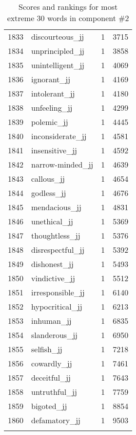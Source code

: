\begin{longtable}[!htbp]{| rlr@{.}l |}
    1833 & discourteous\_jj & 1 & 3715 \\
    1834 & unprincipled\_jj & 1 & 3858 \\
    1835 & unintelligent\_jj & 1 & 4069 \\
    1836 & ignorant\_jj & 1 & 4169 \\
    1837 & intolerant\_jj & 1 & 4180 \\
    1838 & unfeeling\_jj & 1 & 4299 \\
    1839 & polemic\_jj & 1 & 4445 \\
    1840 & inconsiderate\_jj & 1 & 4581 \\
    1841 & insensitive\_jj & 1 & 4592 \\
    1842 & narrow-minded\_jj & 1 & 4639 \\
    1843 & callous\_jj & 1 & 4654 \\
    1844 & godless\_jj & 1 & 4676 \\
    1845 & mendacious\_jj & 1 & 4831 \\
    1846 & unethical\_jj & 1 & 5369 \\
    1847 & thoughtless\_jj & 1 & 5376 \\
    1848 & disrespectful\_jj & 1 & 5392 \\
    1849 & dishonest\_jj & 1 & 5493 \\
    1850 & vindictive\_jj & 1 & 5512 \\
    1851 & irresponsible\_jj & 1 & 6140 \\
    1852 & hypocritical\_jj & 1 & 6213 \\
    1853 & inhuman\_jj & 1 & 6835 \\
    1854 & slanderous\_jj & 1 & 6950 \\
    1855 & selfish\_jj & 1 & 7218 \\
    1856 & cowardly\_jj & 1 & 7461 \\
    1857 & deceitful\_jj & 1 & 7643 \\
    1858 & untruthful\_jj & 1 & 7759 \\
    1859 & bigoted\_jj & 1 & 8854 \\
    1860 & defamatory\_jj & 1 & 9503 \\
    \hline
    \caption{Scores and rankings for most extreme 30 words in component \#2} \\
\end{longtable}
